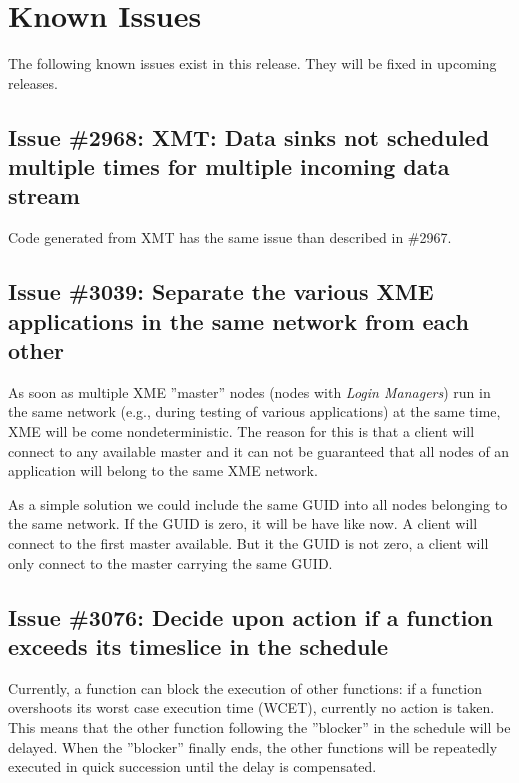 %
% 
%
%
%

\section{Known Issues}
\label{appx:known_issues}

The following known issues exist in this release.
They will be fixed in upcoming releases.

\subsection{Issue \#2968: XMT: Data sinks not scheduled multiple times for multiple incoming data stream}

Code generated from XMT has the same issue than described in \#2967.

\subsection{Issue \#3039: Separate the various XME applications in the same network from each other}

As soon as multiple XME ''master'' nodes (nodes with \emph{Login Managers}) run in the same network
(e.g., during testing of various applications) at the same time, XME will be come nondeterministic.
The reason for this is that a client will connect to any available master and it can not be guaranteed
that all nodes of an application will belong to the same XME network.

As a simple solution we could include the same GUID into all nodes belonging to the same network.
If the GUID is zero, it will be have like now. A client will connect to the first master available.
But it the GUID is not zero, a client will only connect to the master carrying the same GUID.

\subsection{Issue \#3076: Decide upon action if a function exceeds its timeslice in the schedule}

Currently, a function can block the execution of other functions:
if a function overshoots its worst case execution time (WCET), currently no action is taken.
This means that the other function following the ''blocker'' in the schedule will be delayed.
When the ''blocker'' finally ends, the other functions will be repeatedly executed in quick succession until the delay is compensated.

